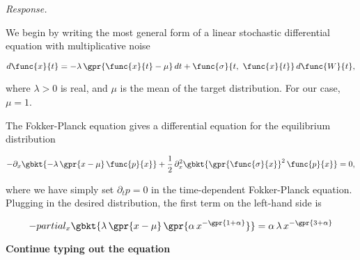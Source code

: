 \textit{Response.}

We begin by writing the most general form of a linear stochastic differential equation with multiplicative noise

\begin{equation}
	d \func{x}{t} = -\lambda\,\gpr{\func{x}{t} - \mu}\,dt + \func{\sigma}{t,\ \func{x}{t}}\,d \func{W}{t},
\end{equation}

where $\lambda > 0$ is real, and $\mu$ is the mean of the target distribution. For our case, $\mu = 1$.

The Fokker-Planck equation gives a differential equation for the equilibrium distribution

\begin{equation}
	-\partial_{x} \gbkt{-\lambda\,\gpr{x - \mu}\,\func{p}{x}} + \frac{1}{2}\,\partial_x^2 \gbkt{\gpr{\func{\sigma}{x}}^2\,\func{p}{x}} = 0,
\end{equation}

where we have simply set $\partial_t p = 0$ in the time-dependent Fokker-Planck equation. Plugging in the desired distribution, the first term on the left-hand side is

\begin{equation}
	-partial_x \gbkt{\lambda\,\gpr{x - \mu}\,\gpr{\alpha\,x^{-\gpr{1 + \alpha}}}} = \alpha\,\lambda\,x^{-\gpr{3 + \alpha}}
\end{equation}

\textbf{Continue typing out the equation}